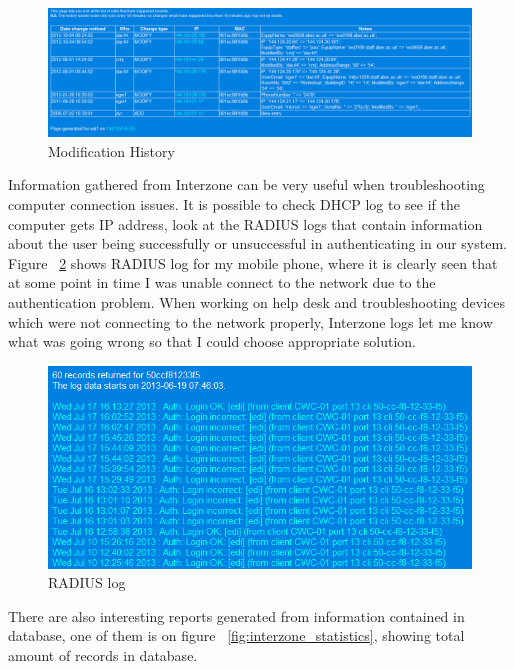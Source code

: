 \documentclass[10pt,a4paper,headinclude=true]{report}
\begin{document}
\begin{figure}[H]
\centering
\centerline{\includegraphics[scale=0.5]{./modification_history}}
\caption{Modification History}
\label{fig:modification_history}
\end{figure}

Information gathered from Interzone can be very useful when troubleshooting computer connection issues. It is possible to check DHCP log to see if the computer gets IP address, look at the RADIUS logs that contain information about the user being successfully or unsuccessful in authenticating in our system. Figure ~\ref{fig:interzone_radius} shows RADIUS log for my mobile phone, where it is clearly seen that at some point in time I was unable connect to the network due to the authentication problem. When working on help desk and troubleshooting devices which were not connecting to the network properly, Interzone logs let me know what was going wrong so that I could choose appropriate solution. 

\begin{figure}[H]
\centering
\centerline{\includegraphics[scale=0.5]{./interzone_radius}}
\caption{RADIUS log}
\label{fig:interzone_radius}
\end{figure}

There are also interesting reports generated from information contained in database, one of them is on figure ~\ref{fig:interzone_statistics}, showing total amount of records in database.
\end{document}

